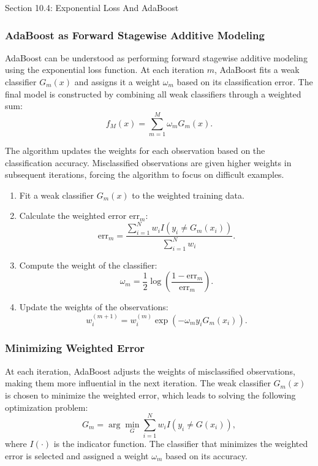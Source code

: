 \begin{notes}{Section 10.4: Exponential Loss And AdaBoost}
    \subsubsection*{AdaBoost as Forward Stagewise Additive Modeling}
    
    AdaBoost can be understood as performing forward stagewise additive modeling using the exponential loss function. At each iteration $m$, AdaBoost fits a weak classifier $G_m(x)$ and assigns it 
    a weight $\omega_m$ based on its classification error. The final model is constructed by combining all weak classifiers through a weighted sum:
    \[
    f_M(x) = \sum_{m=1}^{M} \omega_m G_m(x).
    \]
    
    The algorithm updates the weights for each observation based on the classification accuracy. Misclassified observations are given higher weights in subsequent iterations, forcing the algorithm to focus 
    on difficult examples.
    
    \begin{highlight}
        \begin{enumerate}
            \item Fit a weak classifier $G_m(x)$ to the weighted training data.
            \item Calculate the weighted error $\text{err}_m$:
            \[
            \text{err}_m = \frac{\sum_{i=1}^{N} w_i I(y_i \neq G_m(x_i))}{\sum_{i=1}^{N} w_i}.
            \]
            \item Compute the weight of the classifier:
            \[
            \omega_m = \frac{1}{2} \log \left( \frac{1 - \text{err}_m}{\text{err}_m} \right).
            \]
            \item Update the weights of the observations:
            \[
            w_{i}^{(m+1)} = w_i^{(m)} \exp(-\omega_m y_i G_m(x_i)).
            \]
        \end{enumerate}
    \end{highlight}
    
    \subsubsection*{Minimizing Weighted Error}
    
    At each iteration, AdaBoost adjusts the weights of misclassified observations, making them more influential in the next iteration. The weak classifier $G_m(x)$ is chosen to minimize the weighted 
    error, which leads to solving the following optimization problem:
    \[
    G_m = \arg\min_G \sum_{i=1}^{N} w_i I(y_i \neq G(x_i)),
    \]
    where $I(\cdot)$ is the indicator function. The classifier that minimizes the weighted error is selected and assigned a weight $\omega_m$ based on its accuracy.
    

\end{notes}

